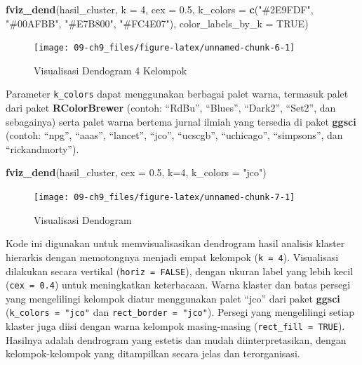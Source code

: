 \documentclass[
  oneside]{book}
\newenvironment{Shaded}{\begin{snugshade}}{\end{snugshade}}
\newcommand{\AttributeTok}[1]{\textcolor[rgb]{0.13,0.29,0.53}{#1}}
\newcommand{\ConstantTok}[1]{\textcolor[rgb]{0.56,0.35,0.01}{#1}}
\newcommand{\DecValTok}[1]{\textcolor[rgb]{0.00,0.00,0.81}{#1}}
\newcommand{\FloatTok}[1]{\textcolor[rgb]{0.00,0.00,0.81}{#1}}
\newcommand{\FunctionTok}[1]{\textcolor[rgb]{0.13,0.29,0.53}{\textbf{#1}}}
\newcommand{\NormalTok}[1]{#1}
\newcommand{\StringTok}[1]{\textcolor[rgb]{0.31,0.60,0.02}{#1}}
\begin{document}
\begin{Shaded}
\begin{Highlighting}[]
\FunctionTok{fviz\_dend}\NormalTok{(hasil\_cluster, }
          \AttributeTok{k =} \DecValTok{4}\NormalTok{,}
          \AttributeTok{cex =} \FloatTok{0.5}\NormalTok{, }
          \AttributeTok{k\_colors =} \FunctionTok{c}\NormalTok{(}\StringTok{"\#2E9FDF"}\NormalTok{, }\StringTok{"\#00AFBB"}\NormalTok{, }\StringTok{"\#E7B800"}\NormalTok{, }\StringTok{"\#FC4E07"}\NormalTok{), }
          \AttributeTok{color\_labels\_by\_k =} \ConstantTok{TRUE}\NormalTok{)}
\end{Highlighting}
\end{Shaded}

\begin{figure}[h]

{\centering \texttt{[image: 09-ch9\_files/figure-latex/unnamed-chunk-6-1]} 

}

\caption{Visualisasi Dendogram 4 Kelompok}\label{fig:unnamed-chunk-6}
\end{figure}

Parameter \texttt{k\_colors} dapat menggunakan berbagai palet warna, termasuk palet dari paket \textbf{RColorBrewer} (contoh: ``RdBu'', ``Blues'', ``Dark2'', ``Set2'', dan sebagainya) serta palet warna bertema jurnal ilmiah yang tersedia di paket \textbf{ggsci} (contoh: ``npg'', ``aaas'', ``lancet'', ``jco'', ``ucscgb'', ``uchicago'', ``simpsons'', dan ``rickandmorty'').

\begin{Shaded}
\begin{Highlighting}[]
\FunctionTok{fviz\_dend}\NormalTok{(hasil\_cluster, }\AttributeTok{cex =} \FloatTok{0.5}\NormalTok{, }\AttributeTok{k=}\DecValTok{4}\NormalTok{,}
\AttributeTok{k\_colors =} \StringTok{"jco"}\NormalTok{)}
\end{Highlighting}
\end{Shaded}

\begin{figure}[h]

{\centering \texttt{[image: 09-ch9\_files/figure-latex/unnamed-chunk-7-1]} 

}

\caption{Visualisasi Dendogram}\label{fig:unnamed-chunk-7}
\end{figure}

Kode ini digunakan untuk memvisualisasikan dendrogram hasil analisis klaster hierarkis dengan memotongnya menjadi empat kelompok (\texttt{k\ =\ 4}). Visualisasi dilakukan secara vertikal (\texttt{horiz\ =\ FALSE}), dengan ukuran label yang lebih kecil (\texttt{cex\ =\ 0.4}) untuk meningkatkan keterbacaan. Warna klaster dan batas persegi yang mengelilingi kelompok diatur menggunakan palet ``jco'' dari paket \textbf{ggsci} (\texttt{k\_colors\ =\ "jco"} dan \texttt{rect\_border\ =\ "jco"}). Persegi yang mengelilingi setiap klaster juga diisi dengan warna kelompok masing-masing (\texttt{rect\_fill\ =\ TRUE}). Hasilnya adalah dendrogram yang estetis dan mudah diinterpretasikan, dengan kelompok-kelompok yang ditampilkan secara jelas dan terorganisasi.
\end{document}
